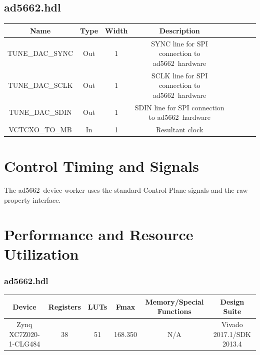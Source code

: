 \documentclass{article}
\def\comp{ad5662}
\begin{document}
\begin{landscape}
	\subsection*{\comp.hdl}
	\begin{scriptsize}
			\begin{tabular}{|c|c|c|c|p{2.6cm}|c|c|c|}
			\hline
			\rowcolor{blue}
			Name & Type  & Width & Description \\
			\hline
			TUNE\_DAC\_SYNC  & Out & 1     & SYNC line for SPI connection to \comp\ hardware    \\
			\hline
			TUNE\_DAC\_SCLK  & Out & 1     & SCLK line for SPI connection to \comp\ hardware    \\
			\hline
			TUNE\_DAC\_SDIN  & Out & 1     & SDIN line for SPI connection to \comp\ hardware    \\
			\hline
			VCTCXO\_TO\_MB  & In & 1     & Resultant clock    \\
			\hline
		\end{tabular}
	\end{scriptsize}
\end{landscape}

\section*{Control Timing and Signals}
The \comp\ device worker uses the standard Control Plane signals and the raw property interface.

\section*{Performance and Resource Utilization}
\subsubsection*{\comp.hdl}
\begin{scriptsize}
	\begin{tabular}{|c|c|c|c|c|c|}
		\hline
		\rowcolor{blue}
		Device             & Registers & LUTs & Fmax        & Memory/Special Functions & Design Suite \\
		\hline
		Zynq XC7Z020-1-CLG484 & 38      & 51  & 168.350 & N/A                         & Vivado 2017.1/SDK 2013.4    \\
		\hline
	\end{tabular}
\end{scriptsize}
\end{document}
